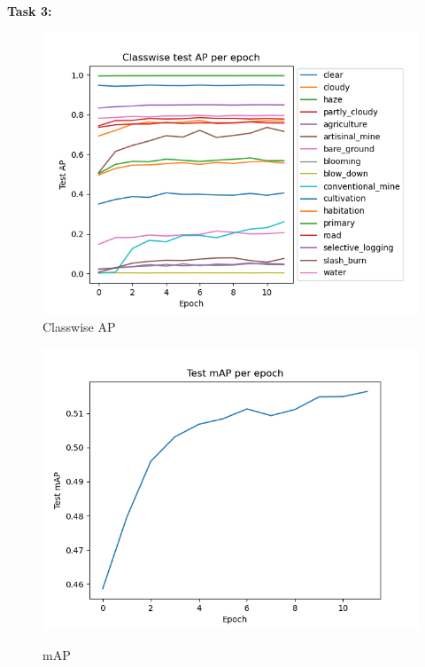 \documentclass[12pt, letterpaper, twoside]{article}
\begin{document}
\newpage
\ \\
\textbf{Task 3:}\\
\begin{figure}[ht] 
  \begin{minipage}[b]{0.5\linewidth}
    \centering
    \includegraphics[scale=0.5]{"Task3_AP.png"}\\ 
    \caption{Classwise AP} 
    \vspace{4ex}
  \end{minipage}%
  \begin{minipage}[b]{0.5\linewidth}
    \centering
    \includegraphics[scale=0.5]{"Task3_mAP.png"}\\ 
    \caption{mAP} 
    \vspace{4ex}

\end{minipage}
\end{figure}
\end{document}
